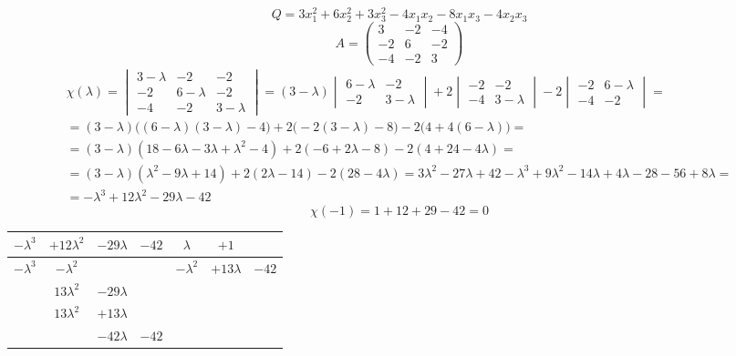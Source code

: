 $$ Q = 3x_1^2 + 6x_2^2 + 3x_3^2 - 4x_1x_2 - 8x_1x_3 - 4x_2x_3 $$
$$ A =
\begin{pmatrix}
	3 & -2 & -4 \\
    -2 & 6 & -2 \\
    -4 & -2 & 3
\end{pmatrix} $$
\begin{multline*}
    \chi(\lambda) =
    \begin{vmatrix}
        3 - \lambda & -2 & -2 \\
        -2 & 6 - \lambda & -2 \\
        -4 & -2 & 3 - \lambda
    \end{vmatrix} = (3 - \lambda)
    \begin{vmatrix}
    	6 - \lambda & -2 \\
        -2 & 3 - \lambda
    \end{vmatrix} + 2
    \begin{vmatrix}
    	-2 & -2 \\
        -4 & 3 - \lambda
    \end{vmatrix} - 2
    \begin{vmatrix}
    	-2 & 6 - \lambda \\
        -4 & -2
    \end{vmatrix} = \\
    = (3 - \lambda) \bigg( (6 - \lambda)(3 - \lambda) - 4 \bigg) + 2 \bigg( -2(3 - \lambda) - 8 \bigg) - 2 \bigg( 4 + 4(6 - \lambda) \bigg) = \\
    = (3 - \lambda)(18 - 6\lambda - 3\lambda + \lambda^2 - 4) + 2(-6 + 2\lambda - 8) - 2(4 + 24 - 4\lambda) = \\
    = (3 - \lambda)(\lambda^2 - 9\lambda + 14) + 2(2\lambda - 14) - 2(28 - 4\lambda) = 3\lambda^2 - 27\lambda + 42 - \lambda^3 + 9\lambda^2 - 14\lambda + 4\lambda - 28 - 56 + 8\lambda = \\
    = -\lambda^3 + 12\lambda^2 - 29\lambda - 42
\end{multline*}
$$ \chi(-1) = 1 + 12 + 29 - 42 = 0 $$
\begin{tabular}{c c c c | c c c}
	$ -\lambda^3 $ & $ +12\lambda^2 $ & $ -29\lambda $ & $ -42 $ & $ \lambda $ & $ +1 $ \\
    \hline
    $ -\lambda^3 $ & $ -\lambda^2 $ & & & $ -\lambda^2 $ & $ + 13\lambda $ & $ -42 $ \\
    \hline
    & $ 13\lambda^2 $ & $ -29\lambda $ & \\
    & $ 13\lambda^2 $ &$ +13\lambda $ & \\
    \hline
    & & $ -42\lambda $ & $ -42 $
\end{tabular}

